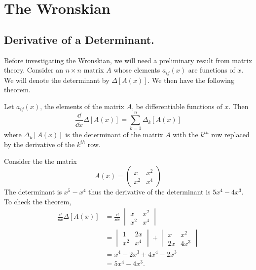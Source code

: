 \section{The Wronskian}
\label{sec_wronskian}




\subsection{Derivative of a Determinant.}
Before investigating the Wronskian, we will need a preliminary result from
matrix theory.  Consider an $n \times n$ matrix $A$ whose elements 
$a_{i j}(x)$
are functions of $x$.  We will denote the determinant by 
$\Delta[A(x)]$.  We then
have the following theorem.

\begin{Result}
  Let $a_{i j}(x)$, the elements of the matrix $A$, be differentiable 
  functions of $x$.  Then
  \[ 
  \frac{\dd}{\dd x} \Delta[A(x)] = \sum_{k=1}^n \Delta_k[A(x)] 
  \]
  where $\Delta_k[A(x)]$ is the determinant of the matrix $A$ with the $k^{t h}$
  row replaced by the derivative of the $k^{t h}$ row.
\end{Result}






\begin{Example}
  Consider the the matrix
  \[ A(x) = 
  \begin{pmatrix}
    x       &       x^2     \\
    x^2     &       x^4
  \end{pmatrix}
  \]
  The determinant is $x^5 - x^4$ thus the derivative of the determinant is
  $5x^4 - 4x^3$.  To check the theorem,
  \begin{align*}
    \frac{\dd}{\dd x} \Delta[A(x)] &= \frac{\dd}{\dd x}\ 
    \begin{vmatrix}
      x       &       x^2     \\
      x^2     &       x^4
    \end{vmatrix} \\
    &=      \begin{vmatrix}
      1       &       2x      \\
      x^2     &       x^4
    \end{vmatrix}  + 
    \begin{vmatrix}
      x       &       x^2     \\
      2x      &       4x^3
    \end{vmatrix} \\
    &= x^4-2x^3+ 4x^4 - 2x^3 \\
    &= 5x^4 - 4x^3.
  \end{align*}
\end{Example}





